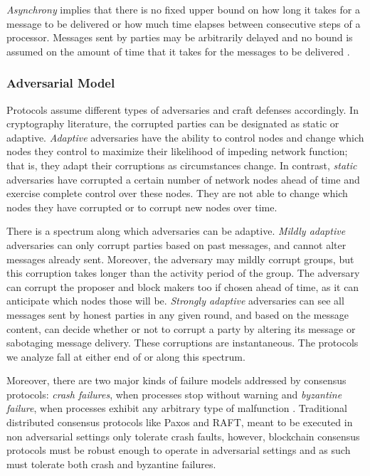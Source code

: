\documentclass[10pt,journal,compsoc]{IEEEtran}
\begin{document}
\emph{Asynchrony} implies that there is no fixed upper bound on how long it takes for a message to be delivered or how much time elapses between consecutive steps of a processor. Messages sent by parties may be arbitrarily delayed and no bound is assumed on the amount of time that it takes for the messages to be delivered \cite{Mahnush}. 

\subsubsection{Adversarial Model}
Protocols assume different types of adversaries and craft defenses accordingly. In cryptography literature, the corrupted parties can be designated as static or adaptive. \emph{Adaptive} adversaries have the ability to control nodes and change which nodes they control to maximize their likelihood of impeding network function; that is, they adapt their corruptions as circumstances change. In contrast, \emph{static} adversaries have corrupted a certain number of network nodes ahead of time and exercise complete control over these nodes. They are not able to change which nodes they have corrupted or to corrupt new nodes over time.

There is a spectrum along which adversaries can be adaptive. \emph{Mildly adaptive} adversaries can only corrupt parties based on past messages, and cannot alter messages already sent. Moreover, the adversary may mildly corrupt groups, but this corruption takes longer than the activity period of the group. The adversary can corrupt the proposer and block makers too if chosen ahead of time, as it can anticipate which nodes those will be. \emph{Strongly adaptive} adversaries can see all messages sent by honest parties in any given round, and based on the message content, can decide whether or not to corrupt a party by altering its message or sabotaging message delivery. These corruptions are instantaneous. The protocols we analyze fall at either end of or along this spectrum.

Moreover, there are two major kinds of failure models addressed by consensus protocols: \emph{crash failures}, when processes stop without warning and \emph{byzantine failure}, when processes exhibit any arbitrary type of malfunction \cite{FLP}. Traditional distributed consensus protocols like Paxos and RAFT, meant to be executed in non adversarial settings only tolerate crash faults, however, blockchain consensus protocols must be robust enough to operate in adversarial settings and as such must tolerate both crash and byzantine failures. 
\end{document}
